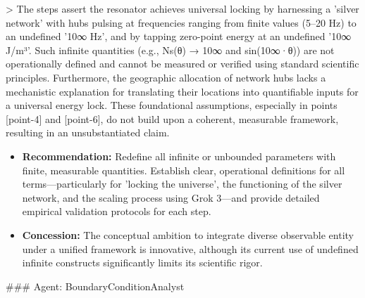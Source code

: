 \documentclass[12pt]{article}
\begin{document}
    > The steps assert the resonator achieves universal locking by harnessing a 'silver network' with hubs pulsing at frequencies ranging from finite values (5–20 Hz) to an undefined '10∞ Hz', and by tapping zero-point energy at an undefined '10∞ J/m³'. Such infinite quantities (e.g., Ns(θ) → 10∞ and sin(10∞·θ)) are not operationally defined and cannot be measured or verified using standard scientific principles. Furthermore, the geographic allocation of network hubs lacks a mechanistic explanation for translating their locations into quantifiable inputs for a universal energy lock. These foundational assumptions, especially in points [point-4] and [point-6], do not build upon a coherent, measurable framework, resulting in an unsubstantiated claim.
\begin{itemize}
  \item \textbf{Recommendation:} Redefine all infinite or unbounded parameters with finite, measurable quantities. Establish clear, operational definitions for all terms—particularly for 'locking the universe', the functioning of the silver network, and the scaling process using Grok 3—and provide detailed empirical validation protocols for each step.
  \item \textbf{Concession:} The conceptual ambition to integrate diverse observable entity under a unified framework is innovative, although its current use of undefined infinite constructs significantly limits its scientific rigor.
\end{itemize}
\hrulefill
\#\#\# Agent: BoundaryConditionAnalyst
\end{document}
